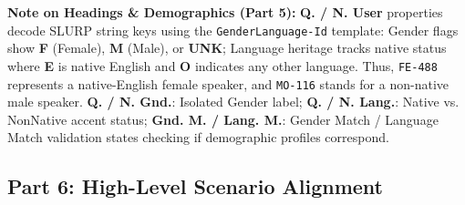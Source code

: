 {\footnotesize\noindent\raggedright \textbf{Note on Headings \& Demographics (Part 5):} \textbf{Q. / N. User} properties decode SLURP string keys using the \texttt{GenderLanguage-Id} template: Gender flags show \textbf{F} (Female), \textbf{M} (Male), or \textbf{UNK}; Language heritage tracks native status where \textbf{E} is native English and \textbf{O} indicates any other language. Thus, \texttt{FE-488} represents a native-English female speaker, and \texttt{MO-116} stands for a non-native male speaker. \textbf{Q. / N. Gnd.}: Isolated Gender label; \textbf{Q. / N. Lang.}: Native vs. NonNative accent status; \textbf{Gnd. M. / Lang. M.}: Gender Match / Language Match validation states checking if demographic profiles correspond.\par}

\subsection*{Part 6: High-Level Scenario Alignment}
